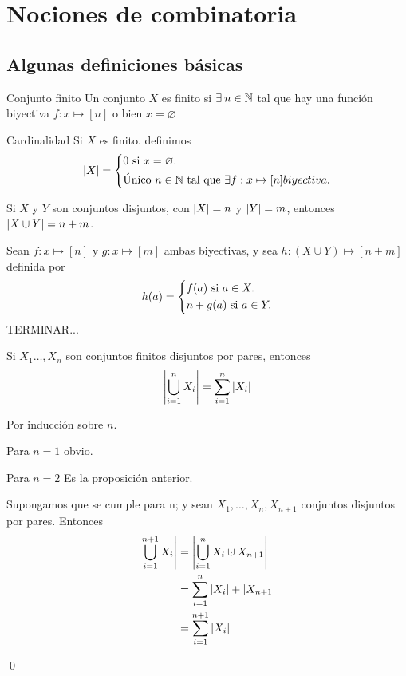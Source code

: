 \section{Nociones de combinatoria}
	\subsection{Algunas definiciones básicas}
		\begin{definition}{Conjunto finito}
			Un conjunto $X$ es finito si $\exists\:n\in\mathbb{N}$ tal que hay una función biyectiva $f:x\mapsto[n]$ o bien $x=\varnothing$ 
		\end{definition}
		\begin{definition}{Cardinalidad}
			Si $X$ es finito. definimos
			\[
			\abs{X}=
			\begin{dcases}
				0\text{ si }x=\varnothing.\\
				\text{Único $n\in\mathbb{N}$ tal que $\exists f:x\mapsto[n]$} biyectiva.
			\end{dcases}
			\]
		\end{definition}
		\begin{theorem}{}
			Si $X$ y $Y$ son conjuntos disjuntos, con $\abs{X}=n$ y $\abs{Y}=m$, entonces $\abs{X\cup Y}=n+m$.
		\end{theorem}
		\begin{demostration}{}
			Sean $f:x\mapsto[n]$ y $g:x\mapsto[m]$ ambas biyectivas, y sea $h:(X\cup Y)\mapsto[n+m]$ definida por
			\[
			h(a)=
			\begin{dcases}
				f(a)\text{ si }a\in X.\\
				n+g(a)\text{ si }a\in Y.
			\end{dcases}
			\]
			TERMINAR...
		\end{demostration}
		\begin{corollary}{}
			Si $X_1\dotso,X_n$ son conjuntos finitos disjuntos por pares, entonces
			$$\abs{\bigcup_{i=1}^{n}{X_i}}=\sum_{i=1}^{n}{\abs{X_i}}$$
		\end{corollary}
		\begin{demostration}{}
			Por inducción sobre $n$.
			
			Para $n=1$ obvio.
			
			Para $n=2$ Es la proposición anterior.
			
			Supongamos que se cumple para n; y sean $X_1,\dotso,X_n,X_{n+1}$ conjuntos disjuntos por pares. Entonces
			\begin{align*}
				\abs{\bigcup_{i=1}^{n+1}{X_i}}&=\abs{\bigcup_{i=1}^{n}{X_i}\cupdot X_{n+1}}\\
				&=\sum_{i=1}^{n}{\abs{X_i}}+\abs{X_{n+1}}\\
				&=\sum_{i=1}^{n+1}{\abs{X_i}}
			\end{align*}
			\begin{flushright}
				\qed
			\end{flushright}
		\end{demostration}
